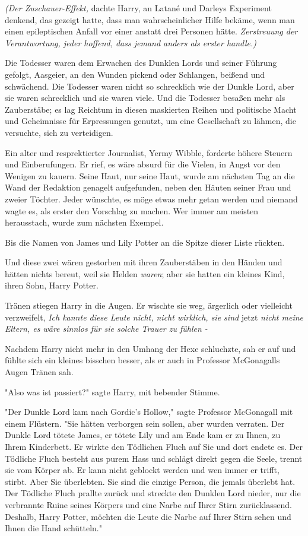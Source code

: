 {\emph{(Der Zuschauer-Effekt,} dachte Harry, an Latané und Darleys Experiment denkend, das gezeigt hatte, dass man wahrscheinlicher Hilfe bekäme, wenn man einen epileptischen Anfall vor einer anstatt drei Personen hätte. \emph{Zerstreuung der Verantwortung, jeder hoffend, dass jemand anders als erster handle.)}

Die Todesser waren dem Erwachen des Dunklen Lords und seiner Führung gefolgt, Aasgeier, an den Wunden pickend oder Schlangen, beißend und schwächend. Die Todesser waren nicht so schrecklich wie der Dunkle Lord, aber sie waren schrecklich und sie waren viele. Und die Todesser besaßen mehr als Zauberstäbe; es lag Reichtum in diesen maskierten Reihen und politische Macht und Geheimnisse für Erpressungen genutzt, um eine Gesellschaft zu lähmen, die versuchte, sich zu verteidigen.

Ein alter und resprektierter Journalist, Yermy Wibble, forderte höhere Steuern und Einberufungen. Er rief, es wäre absurd für die Vielen, in Angst vor den Wenigen zu kauern. Seine Haut, nur seine Haut, wurde am nächsten Tag an die Wand der Redaktion genagelt aufgefunden, neben den Häuten seiner Frau und zweier Töchter. Jeder wünschte, es möge etwas mehr getan werden und niemand wagte es, als erster den Vorschlag zu machen. Wer immer am meisten herausstach, wurde zum nächsten Exempel.

Bis die Namen von James und Lily Potter an die Spitze dieser Liste rückten.

Und diese zwei wären gestorben mit ihren Zauberstäben in den Händen und hätten nichts bereut, weil sie Helden \emph{waren}; aber sie hatten ein kleines Kind, ihren Sohn, Harry Potter.

Tränen stiegen Harry in die Augen. Er wischte sie weg, ärgerlich oder vielleicht verzweifelt, \emph{Ich kannte diese Leute nicht, nicht wirklich, sie sind} jetzt \emph{nicht meine Eltern, es wäre sinnlos für sie solche Trauer zu fühlen -}

Nachdem Harry nicht mehr in den Umhang der Hexe schluchzte, sah er auf und fühlte sich ein kleines bisschen besser, als er auch in Professor McGonagalls Augen Tränen sah.

"Also was ist passiert?" sagte Harry, mit bebender Stimme.

"Der Dunkle Lord kam nach Gordic's Hollow," sagte Professor McGonagall mit einem Flüstern. "Sie hätten verborgen sein sollen, aber wurden verraten. Der Dunkle Lord tötete James, er tötete Lily und am Ende kam er zu Ihnen, zu Ihrem Kinderbett. Er wirkte den Tödlichen Fluch auf Sie und dort endete es. Der Tödliche Fluch besteht aus purem Hass und schlägt direkt gegen die Seele, trennt sie vom Körper ab. Er kann nicht geblockt werden und wen immer er trifft, stirbt. Aber Sie überlebten. Sie sind die einzige Person, die jemals überlebt hat. Der Tödliche Fluch prallte zurück und streckte den Dunklen Lord nieder, nur die verbrannte Ruine seines Körpers und eine Narbe auf Ihrer Stirn zurücklassend. Deshalb, Harry Potter, möchten die Leute die Narbe auf Ihrer Stirn sehen und Ihnen die Hand schütteln."

}
